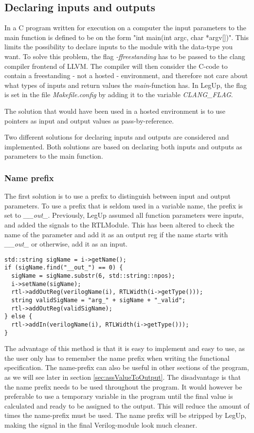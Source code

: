 \subsection{Declaring inputs and outputs}
In a C program written for execution on a computer the input parameters to the main function is defined to be on the form "int main(int argc, char *argv[])". This limits the possibility to declare inputs to the module with the data-type you want. To solve this problem, the flag \textit{-ffreestanding} has to be passed to the clang compiler frontend of LLVM. The compiler will then consider the C-code to contain a freestanding - not a hosted - environment, and therefore not care about what types of inputs and return values the \textit{main}-function has. In LegUp, the flag is set in the file \textit{Makefile.config} by adding it to the variable \textit{CLANG\_FLAG}.

The solution that would have been used in a hosted environment is to use pointers as input and output values as pass-by-reference.

Two different solutions for declaring inputs and outputs are considered and implemented. Both solutions are based on declaring both inputs and outputs as parameters to the main function.
\subsubsection{Name prefix}
The first solution is to use a prefix to distinguish between input and output parameters. To use a prefix that is seldom used in a variable name, the prefix is set to \textit{\_\_out\_}. Previously, LegUp assumed all function parameters were inputs, and added the signals to the RTLModule. This has been altered to check the name of the parameter and add it as an output reg if the name starts with \textit{\_\_out\_} or otherwise, add it as an input.

\begin{lstlisting}
std::string sigName = i->getName();
if (sigName.find("__out_") == 0) {
  sigName = sigName.substr(6, std::string::npos);
  i->setName(sigName);
  rtl->addOutReg(verilogName(i), RTLWidth(i->getType()));
  string validSigName = "arg_" + sigName + "_valid";
  rtl->addOutReg(validSigName);
} else {
  rtl->addIn(verilogName(i), RTLWidth(i->getType())); 
}
\end{lstlisting}
The advantage of this method is that it is easy to implement and easy to use, as the user only has to remember the name prefix when writing the functional specification. The name-prefix can also be useful in other sections of the program, as we will see later in section \ref{sec:assValueToOutput}. The disadvantage is that the name prefix needs to be used throughout the program. It would however be preferable to use a temporary variable in the program until the final value is calculated and ready to be assigned to the output. This will reduce the amount of times the name-prefix must be used.
The name prefix will be stripped by LegUp, making the signal in the final Verilog-module look much cleaner.
